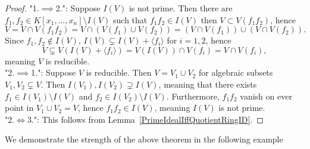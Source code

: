 \begin{proof}
    "1.$\implies$2.": Suppose $I(V)$ is not prime. Then there are $f_1,f_2\in K[x_1,\dots,x_n]\setminus I(V)$ such that $f_1f_2\in I(V)$ then $V\subset V(f_1f_2)$, hence 
    $$V = V\cap V(f_1f_2) = V\cap \left(V\left(f_1\right)\cup V\left(f_2\right)\right) = \left(V\cap V\left(f_1\right)\right)\cup \left(V\cap V\left(f_2\right)\right).$$
    Since $f_1,f_2\notin I(V)$, $I(V)\subsetneq I(V)+\langle f_i\rangle$ for $i=1,2$, hence 
    $$V \subsetneq V(I(V)+\langle f_i\rangle) = V(I(V)) \cap V(f_i) = V \cap V(f_i),$$
    meaning $V$ is reducible.\\
    "2.$\implies$1.": Suppose $V$ is reducible. Then $V = V_1\cup V_2$ for algebraic subsets $V_1,V_2\subsetneq V$. Then $I(V_1),I(V_2)\supsetneq I(V)$, meaning that there exists $f_1\in I(V_1)\setminus I(V)$ and $f_2\in I(V_2)\setminus I(V)$. Furthermore, $f_1f_2$ vanish on ever point in $V_1\cup V_2 =V$, hence $f_1f_2\in I(V)$, meaning $I(V)$ is not prime.\\
    "2.$\iff$3.": This follows from Lemma~\ref{PrimeIdealIffQuotientRingID}. 
\end{proof}
We demonstrate the strength of the above theorem in the following example
